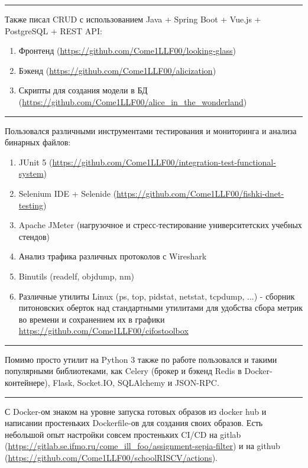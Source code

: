 \documentclass[10pt, final, twoside]{article}
\begin{document}
\par\noindent\rule{\textwidth}{0.1pt}

Также писал CRUD с использованием Java + Spring Boot + Vue.js + PostgreSQL + REST API:
\begin{enumerate}
  \item Фронтенд (\url{https://github.com/Come1LLF00/looking-glass})
  \item Бэкенд (\url{https://github.com/Come1LLF00/alicization})
  \item Скрипты для создания модели в БД (\url{https://github.com/Come1LLF00/alice_in_the_wonderland})
\end{enumerate}

\par\noindent\rule{\textwidth}{0.1pt}

Пользовался различными инструментами тестирования и мониторинга и анализа бинарных файлов:
\begin{enumerate}
  \item JUnit 5 (\url{https://github.com/Come1LLF00/integration-test-functional-system})
  \item Selenium IDE + Selenide (\url{https://github.com/Come1LLF00/fishki-dnet-testing})
  \item Apache JMeter (нагрузочное и стресс-тестирование университетских учебных стендов)
  \item Анализ трафика различных протоколов с Wireshark
  \item Binutils (readelf, objdump, nm)
  \item Различные утилиты Linux (ps, top, pidstat, netstat, tcpdump, ...) - сборник питоновских оберток над стандартными утилитами для удобства сбора метрик во времени и сохранением их в графики \url{https://github.com/Come1LLF00/cifostoolbox}
\end{enumerate}

\par\noindent\rule{\textwidth}{0.1pt}

Помимо просто утилит на Python 3 также по работе пользовался и такими популярными библиотеками, как Celery (брокер и бэкенд Redis в Docker-контейнере), Flask, Socket.IO, SQLAlchemy и JSON-RPC.

\par\noindent\rule{\textwidth}{0.1pt}

С Docker-ом знаком на уровне запуска готовых образов из docker hub и написании простеньких Dockerfile-ов для создания своих образов. Есть небольшой опыт настройки совсем простеньких CI/CD на gitlab (\url{https://gitlab.se.ifmo.ru/come_ill_foo/assignment-sepia-filter}) и на github (\url{https://github.com/Come1LLF00/schoolRISCV/actions}).
\end{document}
